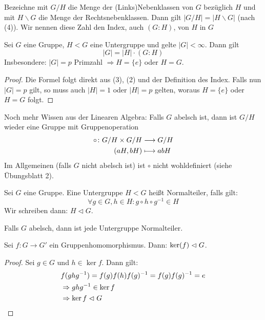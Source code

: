 \documentclass[12pt,a4paper]{scrartcl}
\begin{document}
\begin{defi}
	Bezeichne mit $G/H$ die Menge der (Links)Nebenklassen von $G$ bezüglich $H$ und mit $ H\backslash G$ die Menge der Rechtsnebenklassen. Dann gilt $|G/H| = |H\backslash G|$ (nach (4)). Wir nennen diese Zahl den Index, auch $(G:H)$, von $H$ in $G$
\end{defi}

\begin{satz} \label{thm:lagrange}
	Sei $G$ eine Gruppe, $H<G$ eine Untergruppe und gelte $|G|<\infty$. Dann gilt
	\begin{equation}
		|G| = |H|\cdot (G:H)
	\end{equation}
	Insbesondere: $|G| = p$ Primzahl $\Rightarrow H = \{e\}$ oder $H = G$.
\end{satz}

\begin{proof}
	Die Formel folgt direkt aus (3), (2) und der Definition des Index.
	Falls nun $|G| = p$ gilt, so muss auch $|H| = 1$ oder $|H| = p$ gelten, woraus $H = \{e\}$ oder $H = G$ folgt.
\end{proof}

\noindent Noch mehr Wissen aus der Linearen Algebra: Falls $G$ abelsch ist, dann ist $G/H$ wieder eine Gruppe mit Gruppenoperation
\begin{align*}
	\circ \colon G/H\times G/H &\longrightarrow G/H\\
	(aH,bH)&\longmapsto abH
\end{align*}
Im Allgemeinen (falls $G$ nicht abelsch ist) ist $\circ$ nicht wohldefiniert (siehe Übungsblatt 2).

\begin{defi}
	Sei $G$ eine Gruppe. Eine Untergruppe $H<G$ heißt Normalteiler, falls gilt: 
	\begin{equation*}
	\forall g\in G, h\in H: g\circ h\circ g^{-1}\in H
	\end{equation*}
	Wir schreiben dann: $H\vartriangleleft G$.
\end{defi}
\begin{bem}
	Falls $G$ abelsch, dann ist jede Untergruppe Normalteiler.
\end{bem}

\begin{lem} \label{lem:ker_nt}
	Sei $f\colon G\to G'$ ein Gruppenhomomorphismus.  Dann: $\operatorname{ker}(f)\vartriangleleft G$.
\end{lem}
\begin{proof}
	Sei $g\in G$ und $h\in \ker f$. Dann gilt:
	\begin{align*}
		&f(ghg^{-1}) = f(g)f(h)f(g)^{-1} = f(g)f(g)^{-1} = e \\
		&\Rightarrow ghg^{-1}\in \operatorname{ker} f \\
		&\Rightarrow \operatorname{ker} f\vartriangleleft G
  \qedhere
	\end{align*}
\end{proof}
\end{document}
